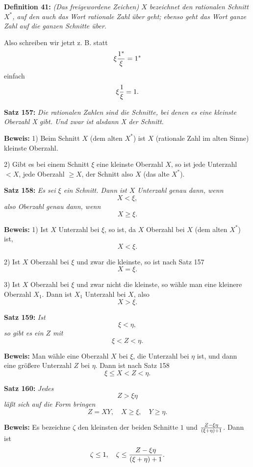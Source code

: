 {\bf Definition 41:} {\it {\rm (Das freigewordene Zeichen)} $X$ bezeichnet den
rationalen Schnitt $X^*$, auf den auch das Wort rationale Zahl \"uber%
geht; ebenso geht das Wort ganze Zahl auf die ganzen Schnitte \"uber.}


Also schreiben wir jetzt z. B. statt
$$\xi{1^* \over \xi} = 1^*$$
einfach
$$\xi{1 \over \xi} = 1.$$
\medskip


{\bf Satz 157:} {\it Die rationalen Zahlen sind die Schnitte, bei denen es
eine kleinste Oberzahl X gibt.  Und zwar ist alsdann X der Schnitt.}

{\bf Beweis:} 1) Beim Schnitt $X$ (dem alten $X^*$) ist $X$ (rationale
Zahl im alten Sinne) kleinste Oberzahl.

2) Gibt es bei einem Schnitt $\xi$ eine kleinste Oberzahl $X$, so
ist jede Unterzahl $< X$, jede Oberzahl $\ge X$, der Schnitt also $X$
(das alte $X^*$).
\medskip


{\bf Satz 158:} {\it Es sei $\xi$ ein Schnitt.  Dann ist $X$ Unterzahl genau
dann, wenn
$$X < \xi,$$
also Oberzahl genau dann, wenn
$$X \ge \xi.$$}%

{\bf Beweis:} 1) Ist $X$ Unterzahl bei $\xi$, so ist, da $X$ Oberzahl bei
$X$ (dem alten $X^*$) ist,
$$X < \xi.$$

2) Ist $X$ Oberzahl bei $\xi$ und zwar die kleinste, so ist nach
Satz 157
$$X = \xi.$$

3) Ist $X$ Oberzahl bei $\xi$ und zwar nicht die kleinste, so w\"ahle
man eine kleinere Oberzahl $X_1$.  Dann ist $X_1$ Unterzahl bei $X$,
also
$$X > \xi.$$
\medskip


{\bf Satz 159:} {\it Ist
$$\xi < \eta,$$
so gibt es ein $Z$ mit
$$\xi < Z < \eta.$$}%

{\bf Beweis:} Man w\"ahle eine Oberzahl $X$ bei $\xi$, die Unterzahl bei
$\eta$ ist, und dann eine gr\"o{\ss}ere Unterzahl $Z$ bei $\eta$.  Dann ist nach
Satz 158
$$\xi \le X < Z < \eta.$$
\medskip


{\bf Satz 160:} {\it Jedes
$$Z > \xi\eta$$
l\"a{\ss}t sich auf die Form bringen
$$Z = XY,\quad X \ge \xi,\quad Y \ge \eta.$$}%

{\bf Beweis:} Es bezeichne $\zeta$ den kleinsten der beiden Schnitte $1$ und
$Z - \xi\eta \over (\xi + \eta) + 1$.  Dann ist
$$\zeta \le 1,\quad \zeta \le {Z - \xi\eta \over (\xi + \eta) + 1}.$$

